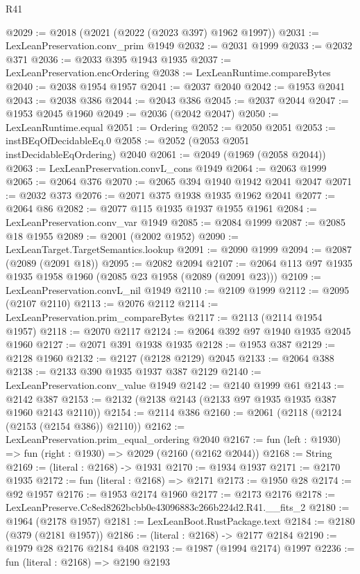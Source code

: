 \begin{lexlean}{R41}
\begin{coremodule}
@2029 := @2018 (@2021 (@2022 (@2023 @397) @1962 @1997))
@2031 := LexLeanPreservation.conv_prim @1949
@2032 := @2031 @1999
@2033 := @2032 @371
@2036 := @2033 @395 @1943 @1935
@2037 := LexLeanPreservation.encOrdering
@2038 := LexLeanRuntime.compareBytes
@2040 := @2038 @1954 @1957
@2041 := @2037 @2040
@2042 := @1953 @2041
@2043 := @2038 @386
@2044 := @2043 @386
@2045 := @2037 @2044
@2047 := @1953 @2045 @1960
@2049 := @2036 (@2042 @2047)
@2050 := LexLeanRuntime.equal
@2051 := Ordering
@2052 := @2050 @2051
@2053 := instBEqOfDecidableEq.{0}
@2058 := @2052 (@2053 @2051 instDecidableEqOrdering) @2040
@2061 := @2049 (@1969 (@2058 @2044))
@2063 := LexLeanPreservation.convL_cons @1949
@2064 := @2063 @1999
@2065 := @2064 @376
@2070 := @2065 @394 @1940 @1942 @2041 @2047
@2071 := @2032 @373
@2076 := @2071 @375 @1938 @1935 @1962 @2041
@2077 := @2064 @86
@2082 := @2077 @115 @1935 @1937 @1955 @1961
@2084 := LexLeanPreservation.conv_var @1949
@2085 := @2084 @1999
@2087 := @2085 @18 @1955
@2089 := @2001 (@2002 @1952)
@2090 := LexLeanTarget.TargetSemantics.lookup
@2091 := @2090 @1999
@2094 := @2087 (@2089 (@2091 @18))
@2095 := @2082 @2094
@2107 := @2064 @113 @97 @1935 @1935 @1958 @1960 (@2085 @23 @1958 (@2089 (@2091 @23)))
@2109 := LexLeanPreservation.convL_nil @1949
@2110 := @2109 @1999
@2112 := @2095 (@2107 @2110)
@2113 := @2076 @2112
@2114 := LexLeanPreservation.prim_compareBytes
@2117 := @2113 (@2114 @1954 @1957)
@2118 := @2070 @2117
@2124 := @2064 @392 @97 @1940 @1935 @2045 @1960
@2127 := @2071 @391 @1938 @1935
@2128 := @1953 @387
@2129 := @2128 @1960
@2132 := @2127 (@2128 @2129) @2045
@2133 := @2064 @388
@2138 := @2133 @390 @1935 @1937 @387 @2129
@2140 := LexLeanPreservation.conv_value @1949
@2142 := @2140 @1999 @61
@2143 := @2142 @387
@2153 := @2132 (@2138 @2143 (@2133 @97 @1935 @1935 @387 @1960 @2143 @2110))
@2154 := @2114 @386
@2160 := @2061 (@2118 (@2124 (@2153 (@2154 @386)) @2110))
@2162 := LexLeanPreservation.prim_equal_ordering @2040
@2167 := fun (left : @1930) => fun (right : @1930) => @2029 (@2160 (@2162 @2044))
@2168 := String
@2169 := (literal : @2168) -> @1931
@2170 := @1934 @1937
@2171 := @2170 @1935
@2172 := fun (literal : @2168) => @2171
@2173 := @1950 @28
@2174 := @92 @1957
@2176 := @1953 @2174 @1960
@2177 := @2173 @2176
@2178 := LexLeanPreserve.Cc8ed8262bcbb0e43096883c266b224d2.R41.__fits_2
@2180 := @1964 (@2178 @1957)
@2181 := LexLeanBoot.RustPackage.text
@2184 := @2180 (@379 (@2181 @1957))
@2186 := (literal : @2168) -> @2177 @2184
@2190 := @1979 @28 @2176 @2184 @408
@2193 := @1987 (@1994 @2174) @1997
@2236 := fun (literal : @2168) =>
  @2190
    @2193

\end{coremodule}
\end{lexlean}
